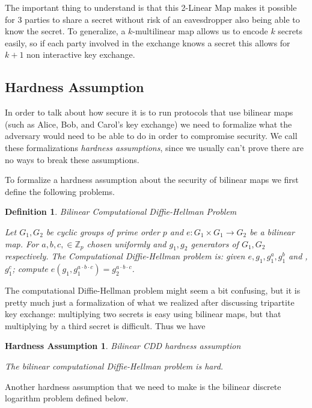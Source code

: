 \documentclass[12pt,twoside]{reedthesis}
\newtheorem{definition}{Definition}
\newtheorem{assumption}{Hardness Assumption}
\newcommand{\Z}[0]{\mathbb{Z}}
\begin{document}
\par The important thing to understand is that this 2-Linear Map makes it possible for 3 parties to share a secret without risk of an eavesdropper also being able to know the secret. To generalize, a $k$-multilinear map allows us to encode $k$ secrets easily, so if each party involved in the exchange knows a secret this allows for $k+1$ non interactive key exchange.

    \subsection{Hardness Assumption}
    
    In order to talk about how secure it is to run protocols that use bilinear maps (such as Alice, Bob, and Carol's key exchange) we need to formalize what the adversary would need to be able to do in order to compromise security. We call these formalizations \textit{hardness assumptions}, since we usually can't prove there are no ways to break these assumptions.
    \par To formalize a hardness assumption about the security of bilinear maps we first define the following problems.
    
    \begin{definition}{Bilinear Computational Diffie-Hellman Problem} \par
    Let $G_1,G_2$ be cyclic groups of prime order $p$ and $e:G_1 \times G_1 \to G_2$ be a bilinear map. For $a,b,c,\in \Z_p$ chosen uniformly and $g_1,g_2$ generators of $G_1,G_2$ respectively. The Computational Diffie-Hellman problem is: given $e,g_1,g_1^a,g_1^b$ and ,$g_1^c$; compute $e(g_1,g_1^{a\cdot b \cdot c}) = g_2^{a\cdot b \cdot c}$.
    \end{definition}
    
    The computational Diffie-Hellman problem might seem a bit confusing, but it is pretty much just a formalization of what we realized after discussing tripartite key exchange: multiplying two secrets is easy using bilinear maps, but that multiplying by a third secret is difficult. Thus we have
    \begin{assumption}{Bilinear CDD hardness assumption}
    \par The bilinear computational Diffie-Hellman problem is hard.
        \end{assumption}
        
        \par Another hardness assumption that we need to make is the bilinear discrete logarithm problem defined below.
       
\end{document}
